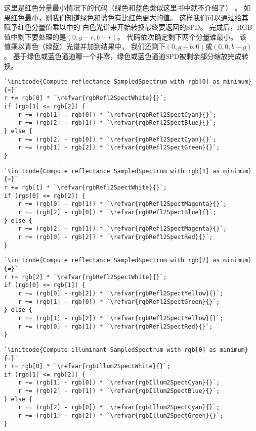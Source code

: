 这里是红色分量最小情况下的代码（绿色和蓝色类似这里书中就不介绍了）
。
如果红色最小，则我们知道绿色和蓝色有比红色更大的值。
这样我们可以通过给其赋予红色分量值乘以中的
白色光谱来开始转换最终要返回的SPD。
完成后，RGB值中剩下要处理的是$(0,g-r,b-r)$。
代码依次确定剩下两个分量谁最小。
该值乘以青色（绿蓝）光谱并加到结果中，
我们还剩下$(0,g-b,0)$或$(0,0,b-g)$。
基于绿色或蓝色通道哪一个非零，绿色或蓝色通道SPD被剩余部分缩放完成转换。
\begin{lstlisting}
`\initcode{Compute reflectance SampledSpectrum with rgb[0] as minimum}{=}`
r += rgb[0] * `\refvar{rgbRefl2SpectWhite}{}`;
if (rgb[1] <= rgb[2]) {
    r += (rgb[1] - rgb[0]) * `\refvar{rgbRefl2SpectCyan}{}`;
    r += (rgb[2] - rgb[1]) * `\refvar{rgbRefl2SpectBlue}{}`;
} else {
    r += (rgb[2] - rgb[0]) * `\refvar{rgbRefl2SpectCyan}{}`;
    r += (rgb[1] - rgb[2]) * `\refvar{rgbRefl2SpectGreen}{}`;
}
\end{lstlisting}
\begin{lstlisting}
`\initcode{Compute reflectance SampledSpectrum with rgb[1] as minimum}{=}`
r += rgb[1] * `\refvar{rgbRefl2SpectWhite}{}`;
if (rgb[0] <= rgb[2]) {
    r += (rgb[0] - rgb[1]) * `\refvar{rgbRefl2SpectMagenta}{}`;
    r += (rgb[2] - rgb[0]) * `\refvar{rgbRefl2SpectBlue}{}`;
} else {
    r += (rgb[2] - rgb[1]) * `\refvar{rgbRefl2SpectMagenta}{}`;
    r += (rgb[0] - rgb[2]) * `\refvar{rgbRefl2SpectRed}{}`;
}
\end{lstlisting}
\begin{lstlisting}
`\initcode{Compute reflectance SampledSpectrum with rgb[2] as minimum}{=}`
r += rgb[2] * `\refvar{rgbRefl2SpectWhite}{}`;
if (rgb[0] <= rgb[1]) {
    r += (rgb[0] - rgb[2]) * `\refvar{rgbRefl2SpectYellow}{}`;
    r += (rgb[1] - rgb[0]) * `\refvar{rgbRefl2SpectGreen}{}`;
} else {
    r += (rgb[1] - rgb[2]) * `\refvar{rgbRefl2SpectYellow}{}`;
    r += (rgb[0] - rgb[1]) * `\refvar{rgbRefl2SpectRed}{}`;
}
\end{lstlisting}
\begin{lstlisting}
`\initcode{Compute illuminant SampledSpectrum with rgb[0] as minimum}{=}`
r += rgb[0] * `\refvar{rgbIllum2SpectWhite}{}`;
if (rgb[1] <= rgb[2]) {
    r += (rgb[1] - rgb[0]) * `\refvar{rgbIllum2SpectCyan}{}`;
    r += (rgb[2] - rgb[1]) * `\refvar{rgbIllum2SpectBlue}{}`;
} else {
    r += (rgb[2] - rgb[0]) * `\refvar{rgbIllum2SpectCyan}{}`;
    r += (rgb[1] - rgb[2]) * `\refvar{rgbIllum2SpectGreen}{}`;
}
\end{lstlisting}
